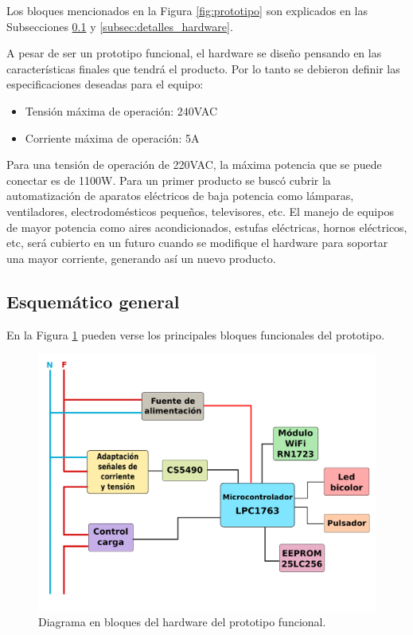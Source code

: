 Los bloques mencionados en la Figura \ref{fig:prototipo} son explicados en las Subsecciones \ref{subsec:esquematico_general} y \ref{subsec:detalles_hardware}.

A pesar de ser un prototipo funcional, el hardware se diseño pensando en las características finales que tendrá el producto. Por lo tanto se debieron definir las especificaciones deseadas para el equipo:

\begin{itemize}
\item Tensión máxima de operación: 240VAC
\item Corriente máxima de operación: 5A
\end{itemize}

Para una tensión de operación de 220VAC, la máxima potencia que se puede conectar es de 1100W. Para un primer producto se buscó cubrir la automatización de aparatos eléctricos de baja potencia como lámparas, ventiladores, electrodomésticos pequeños, televisores, etc. El manejo de equipos de mayor potencia como aires acondicionados, estufas eléctricas, hornos eléctricos, etc, será cubierto en un futuro cuando se modifique el hardware para soportar una mayor corriente, generando así un nuevo producto.



\subsection{Esquemático general}
\label{subsec:esquematico_general}

En la Figura \ref{fig:hardware_diagrama_bloques} pueden verse los principales bloques funcionales del prototipo.

\begin{figure}[h]
	\centering
	\includegraphics[width=12cm]{./Figures/3_1_1_diagrama_bloques_hardware.png}
	\caption{Diagrama en bloques del hardware del prototipo funcional.}
	\label{fig:hardware_diagrama_bloques}
\end{figure}

